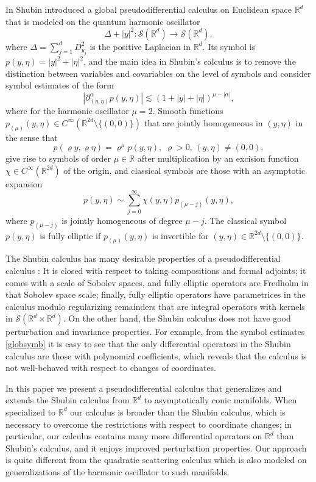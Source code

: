 \documentclass[reqno]{amsart}
\numberwithin{equation}{section}
\theoremstyle{definition}
\def\R{\mathbb R}
\def\S{\mathscr S}
\begin{document}
\noindent
In \cite{ShubinCalc} Shubin introduced a global pseudodifferential calculus on Euclidean space $\R^d$ that is modeled on the quantum harmonic oscillator
$$
\Delta + |y|^2 : \S(\R^d) \to \S(\R^d),
$$
where $\Delta = \sum_{j=1}^d D_{y_j}^2$ is the positive Laplacian in $\R^d$. Its symbol is $p(y,\eta) = |y|^2 + |\eta|^2$, and the main idea in Shubin's calculus is to remove the distinction between variables and covariables on the level of symbols and consider symbol estimates of the form
\begin{equation}\label{globsymb}
|\partial_{(y,\eta)}^{\alpha}p(y,\eta)| \lesssim (1 + |y| + |\eta|)^{\mu-|\alpha|},
\end{equation}
where for the harmonic oscillator $\mu = 2$. Smooth functions $p_{(\mu)}(y,\eta) \in C^{\infty}(\R^{2d}\setminus \{(0,0)\})$ that are jointly homogeneous in $(y,\eta)$ in the sense that
$$
p(\varrho y,\varrho \eta) = \varrho^{\mu}p(y,\eta), \; \varrho > 0,\, (y,\eta) \neq (0,0),
$$
give rise to symbols of order $\mu \in \R$ after multiplication by an excision function $\chi \in C^{\infty}(\R^{2d})$ of the origin, and classical symbols are those with an asymptotic expansion
$$
p(y,\eta) \sim \sum\limits_{j=0}^{\infty}\chi(y,\eta) p_{(\mu-j)}(y,\eta),
$$
where $p_{(\mu-j)}$ is jointly homogeneous of degree $\mu-j$. The classical symbol $p(y,\eta)$ is fully elliptic if $p_{(\mu)}(y,\eta)$ is invertible for $(y,\eta) \in \R^{2d}\setminus\{(0,0)\}$.

The Shubin calculus has many desirable properties of a pseudodifferential calculus \cite{NicolaRodino,ShubinBook}: It is closed with respect to taking compositions and formal adjoints; it comes with a scale of Sobolev spaces, and fully elliptic operators are Fredholm in that Sobolev space scale; finally, fully elliptic operators have parametrices in the calculus modulo regularizing remainders that are integral operators with kernels in $\S(\R^d\times\R^d)$.
On the other hand, the Shubin calculus does not have good perturbation and invariance properties. For example, from the symbol estimates \eqref{globsymb} it is easy to see that the only differential operators in the Shubin calculus are those with polynomial coefficients, which reveals that the calculus is not well-behaved with respect to changes of coordinates.

In this paper we present a pseudodifferential calculus that generalizes and extends the Shubin calculus from $\R^d$ to asymptotically conic manifolds. When specialized to $\R^d$ our calculus is broader than the Shubin calculus, which is necessary to overcome the restrictions with respect to coordinate changes; in particular, our calculus contains many more differential operators on $\R^d$ than Shubin's calculus, and it enjoys improved perturbation properties. Our approach is quite different from the quadratic scattering calculus \cite{Wunsch} which is also modeled on generalizations of the harmonic oscillator to such manifolds.
\end{document}
